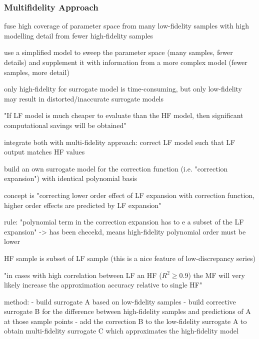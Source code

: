 \subsubsection{Multifidelity Approach}
\label{sec:multifidelity}

\cite{palar_multi-fidelity_2016}
\cite{ng_multifidelity_2012}
\cite{berchier_multi-fidelity_nodate}

fuse high coverage of parameter space from many low-fidelity samples with
high modelling detail from fewer high-fidelity samples

use a simplified model to sweep the parameter space (many samples, fewer details)
and supplement it with information from a more complex model (fewer samples, more detail)

only high-fidelity for surrogate model is time-consuming,
but only low-fidelity may result in distorted/inaccurate surrogate models

"If LF model is much cheaper to evaluate than the HF model, then significant
computational savings will be obtained" \cite{ng_multifidelity_2012}

integrate both with multi-fidelity approach: correct LF model such that LF output matches HF values

build an own surrogate model for the correction function (i.e. "correction expansion") with identical polynomial basis

concept is "correcting lower order effect of LF expansion with correction function, higher order effects are predicted by LF expansion" \cite{palar_multi-fidelity_2016}

rule: "polynomial term in the correction expansion has to e a subset of the LF expansion" \cite{palar_multi-fidelity_2016}
-> has been checekd, means high-fidelity polynomial order must be lower 

HF sample is subset of LF sample (this is a nice feature of low-discrepancy series)

"in cases with high correlation between LF an HF ($R^2 \geq 0.9$) the MF will very likely increase the approximation accuracy relative to single HF" \cite{palar_multi-fidelity_2016}

method:
- build surrogate A based on low-fidelity samples
- build corrective surrogate B for the difference between high-fidelity samples and predictions of A at those sample points
- add the correction B to the low-fidelity surrogate A to obtain multi-fidelity surrogate C which approximates the high-fidelity model

